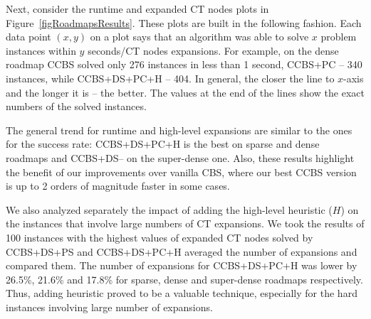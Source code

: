 \documentclass[letterpaper]{article} %
\newcommand\konstantin[1]{\nb{\textbf{Konstantin:}}{red}{#1}}
\newcommand\roni[1]{\nb{\textbf{Roni:}}{orange}{#1}}
\newcommand{\cbs}{\ac{CBS}\xspace}
\newcommand{\ccbs}{\ac{CCBS}\xspace}
\newcommand{\ct}{\ac{CT}\xspace}
\newcommand{\pc}{\ac{PC}\xspace}
\newcommand{\ds}{\ac{DS}\xspace}
\begin{document}

Next, consider the runtime and expanded \ct nodes plots in Figure~\ref{figRoadmapsResults}. 
These plots are built in the following fashion. 
Each data point $(x,y)$ on a plot says that an algorithm was able to solve $x$ problem instances within $y$ seconds/\ct nodes expansions. 
For example, on the dense roadmap \ccbs solved only 276 instances in less than 1 second, \ccbs+PC -- 340 instances, while \ccbs+\ds+\pc+H -- 404. In general, the closer the line to $x$-axis and the longer it is -- the better. The values at the end of the lines show the exact numbers of the solved instances. 

The general trend for runtime and high-level expansions are similar to the ones for the success rate: 
\ccbs+\ds+\pc+H is the best on sparse and dense roadmaps and \ccbs+\ds -- on the super-dense one. Also, these results highlight the benefit of our improvements over vanilla \cbs, where our best \ccbs version is up to 2 orders of magnitude faster in some cases. 



We also analyzed separately the impact of adding the high-level heuristic ($H$) on the instances that involve large numbers of \ct expansions. We took the results of 100 instances with the highest values of expanded \ct nodes solved by \ccbs+DS+PS and \ccbs+DS+PC+H averaged the number of expansions and compared them. The number of expansions for \ccbs+DS+PC+H was lower by 26.5\%, 21.6\% and 17.8\% for sparse, dense and super-dense roadmaps respectively. Thus, adding heuristic proved to be a valuable technique, especially for the hard instances involving large number of expansions.
\end{document}
